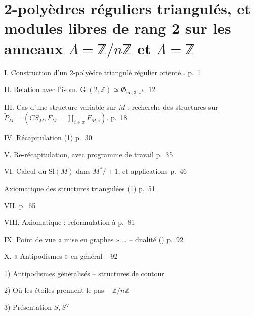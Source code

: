 \documentclass[11pt,a4paper]{article}
\begin{document}
\section{2-polyèdres réguliers triangulés, et modules libres de rang 2 sur les anneaux $\Lambda=\mathbb{Z}/n\mathbb{Z}$ et $\Lambda=\mathbb{Z}$}


I. Construction d'un 2-polyèdre triangulé régulier orienté… \quad p.~1

II. Relation avec l'isom. $\mathrm{Gl}(2,\mathbb{Z}) \simeq \mathfrak{G}_{\infty,3}$ \quad p.~12

III. Cas d'une structure  variable sur $M$ : recherche des structures sur $\widetilde{P}_{M} = (CS_M, F_M = \coprod_{i \in \pi} F_{M,i})$. \quad p.~18

IV. Récapitulation (1) \quad p.~30

V. Re-récapitulation, avec programme de travail \quad p.~35

VI. Calcul du   $\mathrm{Sl}(M)$ dans $M^*/\pm 1$, et applications \quad p.~46

Axiomatique des structures triangulées  (1) \quad p.~51

VII.  \ill{} \quad p.~65

VIII. Axiomatique : reformulation  \struck{\ill{}} à \struck{\ill{}} \quad p.~81

IX. Point de vue  « mise en graphes » … -- dualité (\ill{}) \quad p.~92

X. « Antipodismes » en général --   \quad \struck{\ill{}} 92

1) Antipodismes généralisés -- structures de contour  

2) Où les étoiles prennent le pas --  \ill{} $\mathbb{Z}/n\mathbb{Z}$ --  \ill{} 

3) Présentation  $S, S^{\vee}$ \quad \struck{\ill{}}
\end{document}
